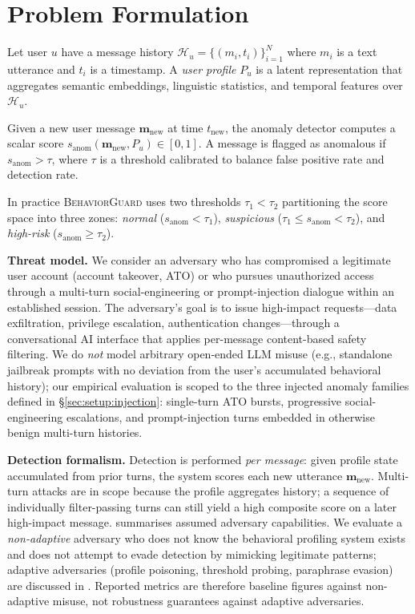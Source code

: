 \documentclass[conference]{IEEEtran}
\newcommand{\BG}{\textsc{BehaviorGuard}}
\newcommand{\anomaly}{s_{\mathrm{anom}}}
\newcommand{\Pu}{P_u}
\newcommand{\munew}{\mathbf{m}_{\mathrm{new}}}
\begin{document}
\section{Problem Formulation}
\label{sec:problem}

Let user $u$ have a message history
$\mathcal{H}_u = \{(m_i, t_i)\}_{i=1}^{N}$
where $m_i$ is a text utterance and $t_i$ is a timestamp.
A \emph{user profile} $\Pu$ is a latent representation that aggregates semantic
embeddings, linguistic statistics, and temporal features over $\mathcal{H}_u$.

Given a new user message $\munew$ at time $t_{\mathrm{new}}$, the anomaly detector
computes a scalar score $\anomaly(\munew, \Pu) \in [0,1]$.
A message is flagged as anomalous if $\anomaly > \tau$, where $\tau$ is a threshold
calibrated to balance false positive rate and detection rate.

In practice \BG{} uses two thresholds $\tau_1 < \tau_2$ partitioning the score space
into three zones: \emph{normal} ($\anomaly < \tau_1$),
\emph{suspicious} ($\tau_1 \le \anomaly < \tau_2$), and
\emph{high-risk} ($\anomaly \ge \tau_2$).

\textbf{Threat model.}
We consider an adversary who has compromised a legitimate user account (account
takeover, ATO) or who pursues unauthorized access through a multi-turn
social-engineering or prompt-injection dialogue within an established session.
The adversary's goal is to issue high-impact requests---data exfiltration, privilege
escalation, authentication changes---through a conversational AI interface that applies
per-message content-based safety filtering.
We do \emph{not} model arbitrary open-ended LLM misuse (e.g., standalone jailbreak
prompts with no deviation from the user's accumulated behavioral history); our
empirical evaluation is scoped to the three injected anomaly families defined in
\S\ref{sec:setup:injection}: single-turn ATO bursts, progressive social-engineering
escalations, and prompt-injection turns embedded in otherwise benign multi-turn
histories.

\textbf{Detection formalism.}
Detection is performed \emph{per message}: given profile state accumulated from prior
turns, the system scores each new utterance $\munew$.
Multi-turn attacks are in scope because the profile aggregates history; a sequence of
individually filter-passing turns can still yield a high composite score on a later
high-impact message.
 summarises assumed adversary capabilities.
We evaluate a \emph{non-adaptive} adversary who does not know the behavioral profiling
system exists and does not attempt to evade detection by mimicking legitimate patterns;
adaptive adversaries (profile poisoning, threshold probing, paraphrase evasion) are
discussed in .
Reported metrics are therefore baseline figures against non-adaptive misuse, not
robustness guarantees against adaptive adversaries.
\end{document}
